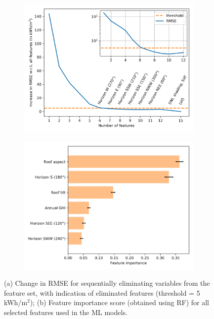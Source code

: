\begin{figure}[tb]
\centering
\begin{subfigure}{.49\textwidth}
  \centering
  \includegraphics[width=\linewidth]{images/Figs/ftr_selection_topdown_reduced_run1_w_excluded.png}
  \subcaption{}
  \label{fig:chile_RFE}
\end{subfigure}
\begin{subfigure}{.49\textwidth}
  \centering
  \includegraphics[width=\linewidth]{images/Figs/Feature_importance_selFtrs_mean_10k.png}  
  \subcaption{}
    \label{fig:chile_FtrImp}
\end{subfigure}
\caption{(a) Change in RMSE for sequentially eliminating variables from the feature set, with indication of eliminated features (threshold = 5 kWh/m$^2$); (b) Feature importance score (obtained using RF) for all selected features used in the ML models.}
\label{fig:chile_ftrs}
\end{figure}

